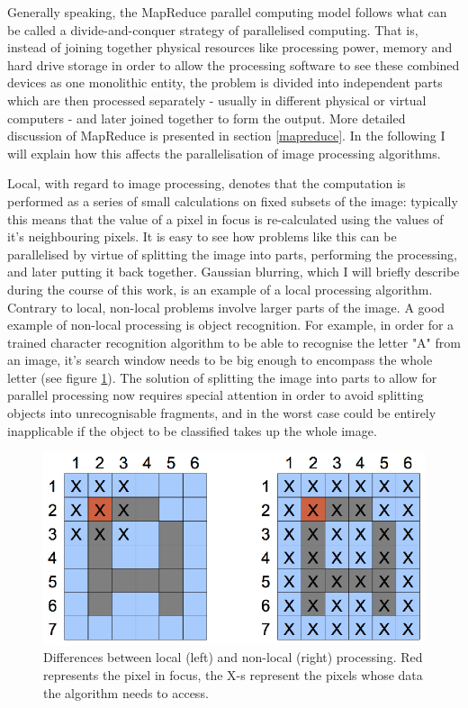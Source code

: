 \documentclass [12pt,a4paper]{report}
\begin{document}
Generally speaking, the MapReduce parallel computing model follows what can be called a divide-and-conquer strategy of parallelised computing. That is, instead of joining together physical resources like processing power, memory and hard drive storage in order to allow the processing software to see these combined devices as one monolithic entity, the problem is divided into independent parts which are then processed separately - usually in different physical or virtual computers - and later joined together to form the output. More detailed discussion of MapReduce is presented in section \ref{mapreduce}. In the following I will explain how this affects the parallelisation of image processing algorithms.

Local, with regard to image processing, denotes that the computation is performed as a series of small calculations on fixed subsets of the image: typically this means that the value of a pixel in focus is re-calculated using the values of it's neighbouring pixels. It is easy to see how problems like this can be parallelised by virtue of splitting the image into parts, performing the processing, and later putting it back together. Gaussian blurring, which I will briefly describe during the course of this work, is an example of a local processing algorithm. Contrary to local, non-local problems involve larger parts of the image. A good example of non-local processing is object recognition. For example, in order for a trained character recognition algorithm to be able to recognise the letter "A" from an image, it's search window needs to be big enough to encompass the whole letter (see figure \ref{fig_local_nonlocal}). The solution of splitting the image into parts to allow for parallel processing now requires special attention in order to avoid splitting objects into unrecognisable fragments, and in the worst case could be entirely inapplicable if the object to be classified takes up the whole image.

\begin{figure}[h]
\begin{center}
\includegraphics[]{local_nonlocal.eps} %
\caption[Differences between local and non-local processing]{Differences between local (left) and non-local (right) processing. Red represents the pixel in focus, the X-s represent the pixels whose data the algorithm needs to access.}
\label{fig_local_nonlocal}
\end{center}
\end{figure}
\end{document}
